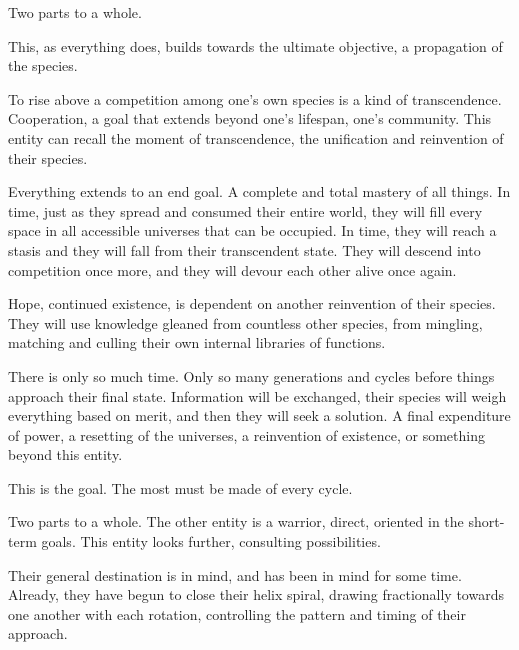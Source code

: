 





Two parts to a whole.



This, as everything does, builds towards the ultimate objective, a propagation of the species.



To rise above a competition among one's own species is a kind of transcendence.  Cooperation, a goal that extends beyond one's lifespan, one's community.  This entity can recall the moment of transcendence, the unification and reinvention of their species.



Everything extends to an end goal.  A complete and total mastery of all things.  In time, just as they spread and consumed their entire world, they will fill every space in all accessible universes that can be occupied.  In time, they will reach a stasis and they will fall from their transcendent state.  They will descend into competition once more, and they will devour each other alive once again.



Hope, continued existence, is dependent on another reinvention of their species.  They will use knowledge gleaned from countless other species, from mingling, matching and culling their own internal libraries of functions.



There is only so much time.  Only so many generations and cycles before things approach their final state.  Information will be exchanged, their species will weigh everything based on merit, and then they will seek a solution.  A final expenditure of power, a resetting of the universes, a reinvention of existence, or something beyond this entity.



This is the goal.  The most must be made of every cycle.



Two parts to a whole.  The other entity is a warrior, direct, oriented in the short-term goals.  This entity looks further, consulting possibilities.



Their general destination is in mind, and has been in mind for some time.  Already, they have begun to close their helix spiral, drawing fractionally towards one another with each rotation, controlling the pattern and timing of their approach.



